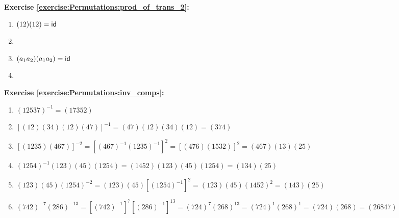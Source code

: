 \noindent\textbf{Exercise \ref{exercise:Permutations:prod_of_trans_2}:}
\begin{multicols}{2}
\begin{enumerate}[{a.}]
\item
$(12)(12) = \sf{id}$

\item

\item
$(a_1 a_2)(a_1 a_2) = \sf{id}$

\item
\end{enumerate}
\end{multicols}

\noindent\textbf{Exercise \ref{exercise:Permutations:inv_comps}:} %
\begin{enumerate}[{a.}]    
\item
$(12537)^{-1} = (17352)$

\item
$[(12)(34)(12)(47)]^{-1} = (47)(12)(34)(12) = (374)$

\item
$[(1235)(467)]^{-2} = [(467)^{-1}(1235)^{-1}]^2 = [(476)(1532)]^2 = (467)(13)(25)$

\item
$(1254)^{-1}(123)(45)(1254) = (1452)(123)(45)(1254) = (134)(25)$

\item
$(123)(45)(1254)^{-2} = (123)(45)[(1254)^{-1}]^{2} = (123)(45)(1452)^{2} =  (143)(25)$

\item
$(742)^{-7}(286)^{-13} = [(742)^{-1}]^{7}[(286)^{-1}]^{13} = (724)^{7}(268)^{13} = (724)^{1}(268)^{1} = (724)(268) = (26847)$
\end{enumerate}

